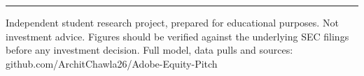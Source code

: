 \documentclass[9pt]{extarticle}
\begin{document}
\vspace{4pt}
\hrule
\vspace{2pt}
{\footnotesize Independent student research project, prepared for educational purposes. Not investment advice. Figures should be verified against the underlying SEC filings before any investment decision. Full model, data pulls and sources: github.com/ArchitChawla26/Adobe-Equity-Pitch}
\end{document}
